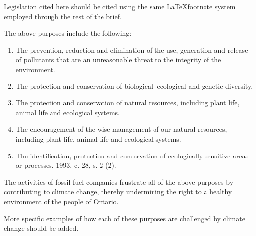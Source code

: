\begin{vcom}
	Legislation cited here should be cited using the same \LaTeX footnote system employed through the rest of the brief.
\end{vcom}


The above purposes include the following:
\begin{enumerate}
	\item The prevention, reduction and elimination of the use, generation and release of pollutants that are an unreasonable threat to the integrity of the environment.
	\item The protection and conservation of biological, ecological and genetic diversity.
	\item The protection and conservation of natural resources, including plant life, animal life and ecological systems.
	\item The encouragement of the wise management of our natural resources, including plant life, animal life and ecological systems.
	\item The identification, protection and conservation of ecologically sensitive areas or processes.  1993, c. 28, s. 2 (2). 
\end{enumerate}



The activities of fossil fuel companies frustrate all of the above purposes by contributing to climate change, thereby undermining the right to a healthy environment of the people of Ontario.

\begin{vcom}
	More specific examples of how each of these purposes are challenged by climate change should be added.
\end{vcom}



